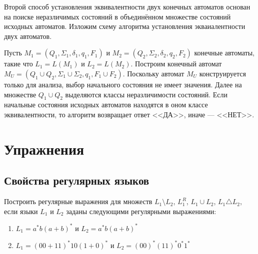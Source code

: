 Второй способ установления эквивалентности двух конечных автоматов основан на поиске неразличимых состояний в объединённом множестве состояний исходных автоматов. Изложим схему алгоритма установления экваиалентности двух автоматов.

Пусть $M_1 = (Q_1,\Sigma_1, \delta_1, q_1, F_1)$ и $M_2 = (Q_2,\Sigma_2, \delta_2, q_2, F_2)$ конечные автоматы, такие что $L_1 = L(M_1)$ и $L_2 = L(M_2)$. Построим конечный автомат $M_U = (Q_1 \cup Q_2, \Sigma_1 \cup \Sigma_2, q_1, F_1 \cup F_2)$. Поскольку автомат $M_U$ конструируется только для анализа, выбор начального состояния не имеет значения. Далее на множестве $Q_1 \cup Q_2$ выделяются классы неразличимости состояний. Если начальные состояния исходных автоматов находятся в оном классе эквивалентности, то алгоритм возвращает ответ <<ДА>>, иначе --- <<НЕТ>>.

\section{Упражнения}
\label{Chapter5Exs}
\subsection*{Свойства регулярных языков}
Построить регулярные выражения для множеств $L_1 \setminus L_2$, $L_1^R$, $L_1 \cup L_2$, $L_1 \triangle L_2$, если языки  $L_1$ и $L_2$ заданы следующими регулярными выражениями:
\begin{enumerate}
\item $L_1 = a^*b(a+b)^*$ и $L_2 = a^*b(a+b)^*$
\item $L_1 = (00 + 11)^*10(1 + 0)^*$ и $L_2=(00)^*(11)^*0^*1^*$
\end{enumerate}

